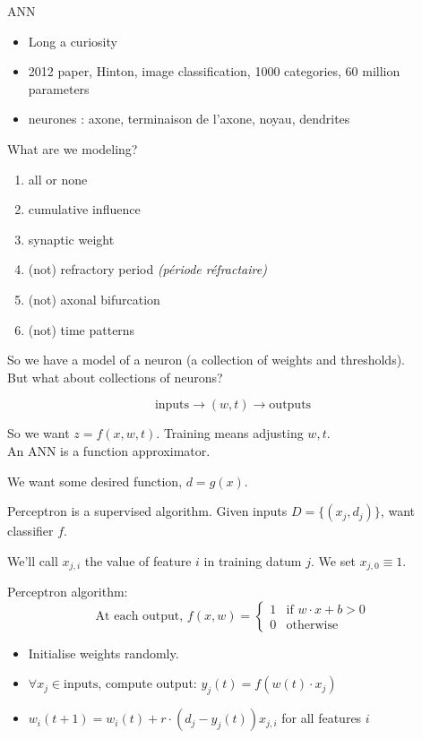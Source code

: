 
\usepackage{epsfig}




ANN
\begin{itemize}
\item Long a curiosity
\item 2012 paper, Hinton, image classification, 1000 categories, 60 million parameters
\item neurones : axone, terminaison de l'axone, noyau, dendrites
\end{itemize}



\bigskip

What are we modeling?
\begin{enumerate}
\item all or none
\item cumulative influence
\item synaptic weight
\item (not) refractory period \textit{(période réfractaire)}
\item (not) axonal bifurcation
\item (not) time patterns
\end{enumerate}

So we have a model of a neuron (a collection of weights and thresholds).\\
But what about collections of neurons?

\begin{displaymath}
  \mbox{inputs} \rightarrow (w, t) \rightarrow \mbox{outputs}
\end{displaymath}

So we want $z = f(x, w, t)$.  Training means adjusting $w, t$.\\
An ANN is a function approximator.

We want some desired function, $d = g(x)$.



Perceptron is a supervised algorithm.  Given inputs $D = \{(x_j, d_j)\}$, want classifier $f$.

We'll call $x_{j,i}$ the value of feature $i$ in training datum $j$.  We set $x_{j,0}\equiv 1$.

Perceptron algorithm:
\begin{displaymath}
  \mbox{At each output, }
  f(x, w) = \left\{
    \begin{array}{ll}
      1 & \mbox{if } w\cdot x + b > 0 \\
      0 & \mbox{otherwise}
    \end{array}
 \right.
\end{displaymath}
\begin{itemize}
\item Initialise weights randomly.
\item $\forall x_j\in \mbox{inputs}$, compute output: $y_j(t) = f(w(t)\cdot x_j)$
\item $w_i(t+1) = w_i(t) + r\cdot (d_j - y_j(t)) x_{j,i}$ for all features $i$
\end{itemize}

